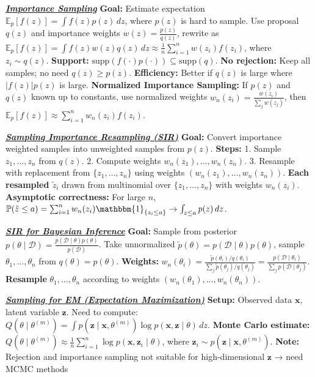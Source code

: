 \documentclass[10pt]{article}
\newcommand{\bulletPoint}[1]{\ul{\textit{\textbf{#1}}}}
\begin{document}
\begin{multicols*}{2}
\bulletPoint{Importance Sampling}\quad
\textbf{Goal:} Estimate expectation $\mathbb{E}_p[f(z)] = \int f(z)p(z)\,dz$, where $p(z)$ is hard to sample.  
Use proposal $q(z)$ and importance weights $w(z) = \frac{p(z)}{q(z)}$, rewrite as  
$\mathbb{E}_p[f(z)] = \int f(z)w(z)q(z)\,dz \approx \frac{1}{n} \sum_{i=1}^n w(z_i)f(z_i)$, where $z_i \sim q(z)$. 
\textbf{Support:} $\text{supp}(f(\cdot)p(\cdot)) \subseteq \text{supp}(q)$. 
\textbf{No rejection:} Keep all samples; no need $q(z) \geq p(z)$. 
\textbf{Efficiency:} Better if $q(z)$ is large where $|f(z)|p(z)$ is large. 
\textbf{Normalized Importance Sampling:}
If $p(z)$ and $q(z)$ known up to constants, use normalized weights  
$w_n(z_i) = \frac{w(z_i)}{\sum_j w(z_j)}$, then  
$\mathbb{E}_p[f(z)] \approx \sum_{i=1}^n w_n(z_i)f(z_i)$. 

\bulletPoint{Sampling Importance Resampling (SIR)}\quad
\textbf{Goal:} Convert importance weighted samples into unweighted samples from $p(z)$. 
\textbf{Steps:}
1. Sample $z_1,\dots,z_n$ from $q(z)$.  
2. Compute weights $w_n(z_1),\dots,w_n(z_n)$. 
3. Resample with replacement from $\{z_1,\dots,z_n\}$ using weights $(w_n(z_1),\dots,w_n(z_n))$. 
\textbf{Each resampled $\tilde{z}_i$} drawn from multinomial over $\{z_1,\dots,z_n\}$ with weights $w_n(z_i)$. 
\textbf{Asymptotic correctness:} For large $n$, 
$\mathbb{P}(\tilde{z} \leq a) = \sum_{i=1}^n w_n(z_i)\mathbbm{1}_{\{z_i \leq a\}} \to \int_{z \leq a} p(z)\,dz$. 

\bulletPoint{SIR for Bayesian Inference}\quad
\textbf{Goal:} Sample from posterior $p(\theta \mid \mathcal{D}) = \frac{p(\mathcal{D} \mid \theta)p(\theta)}{p(\mathcal{D})}$. 
Take unnormalized $\tilde{p}(\theta) = p(\mathcal{D} \mid \theta)p(\theta)$, sample $\theta_1,\dots,\theta_n$ from $q(\theta) = p(\theta)$. 
\textbf{Weights:}
$w_n(\theta_i) = \frac{\tilde{p}(\theta_i)/q(\theta_i)}{\sum_j \tilde{p}(\theta_j)/q(\theta_j)} = \frac{p(\mathcal{D} \mid \theta_i)}{\sum_j p(\mathcal{D} \mid \theta_j)}$. 
\textbf{Resample } $\theta_1,\dots,\theta_n$ according to weights $(w_n(\theta_1),\dots,w_n(\theta_n))$. 

\bulletPoint{Sampling for EM (Expectation Maximization)}\quad
\textbf{Setup:} Observed data $\mathbf{x}$, latent variable $\mathbf{z}$. 
Need to compute:
$Q(\theta \mid \theta^{(m)}) = \int p(\mathbf{z} \mid \mathbf{x}, \theta^{(m)}) \log p(\mathbf{x}, \mathbf{z} \mid \theta)\,dz$. 
\textbf{Monte Carlo estimate:}
$Q(\theta \mid \theta^{(m)}) \approx \frac{1}{n} \sum_{i=1}^n \log p(\mathbf{x}, \mathbf{z}_i \mid \theta)$, where $\mathbf{z}_i \sim p(\mathbf{z} \mid \mathbf{x}, \theta^{(m)})$. 
\textbf{Note:} Rejection and importance sampling not suitable for high-dimensional $\mathbf{z}$ → need MCMC methods


\end{multicols*}
\end{document}
